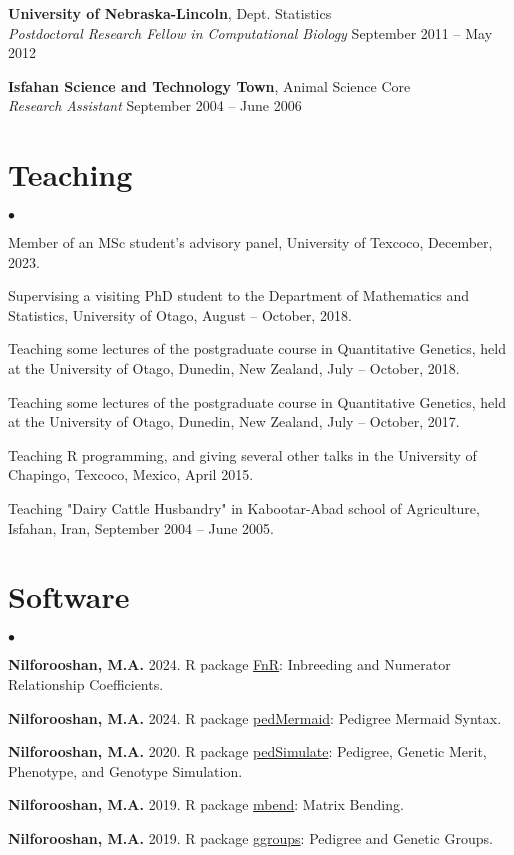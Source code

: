 \documentclass[margin,line]{res}
\newenvironment{list2}{
  \begin{list}{$\bullet$}{%
      \setlength{\itemsep}{0in}
      \setlength{\parsep}{0in} \setlength{\parskip}{0in}
      \setlength{\topsep}{0in} \setlength{\partopsep}{0in}
      \setlength{\leftmargin}{0.2in}}}{\end{list}}
\begin{document}
\begin{resume}
  {\bf University of Nebraska-Lincoln}, Dept. Statistics \\
  {\em Postdoctoral Research Fellow in Computational Biology} \hfill{September 2011 -- May 2012}

  {\bf Isfahan Science and Technology Town}, Animal Science Core \\
  {\em Research Assistant} \hfill{September 2004 -- June 2006}
  \section{\sc Teaching}

  \begin{list2}
    \item Member of an MSc student's advisory panel, University of Texcoco, December, 2023.
    \item Supervising a visiting PhD student to the Department of Mathematics and Statistics, University of Otago, August -- October, 2018.
    \item Teaching some lectures of the postgraduate course in Quantitative Genetics, held at the University of Otago, Dunedin, New Zealand, July -- October, 2018.
    \item Teaching some lectures of the postgraduate course in Quantitative Genetics, held at the University of Otago, Dunedin, New Zealand, July -- October, 2017.
    \item Teaching R programming, and giving several other talks in the University of Chapingo, Texcoco, Mexico, April 2015.
    \item Teaching "Dairy Cattle Husbandry" in Kabootar-Abad school of Agriculture, Isfahan, Iran, September 2004 -- June 2005.
  \end{list2}
  \section{\sc Software}

  \begin{list2}
    \item {\bf Nilforooshan, M.A.} 2024. R package \href{https://CRAN.R-project.org/package=FnR}{FnR}: Inbreeding and Numerator Relationship Coefficients. \\
    \item {\bf Nilforooshan, M.A.} 2024. R package \href{https://CRAN.R-project.org/package=pedMermaid}{pedMermaid}: Pedigree Mermaid Syntax. \\
    \item {\bf Nilforooshan, M.A.} 2020. R package \href{https://CRAN.R-project.org/package=pedSimulate}{pedSimulate}: Pedigree, Genetic Merit, Phenotype, and Genotype Simulation. \\
    \item {\bf Nilforooshan, M.A.} 2019. R package \href{https://CRAN.R-project.org/package=mbend}{mbend}: Matrix Bending. \\
    \item {\bf Nilforooshan, M.A.} 2019. R package \href{https://CRAN.R-project.org/package=ggroups}{ggroups}: Pedigree and Genetic Groups.
  \end{list2}

\end{resume}
\end{document}
